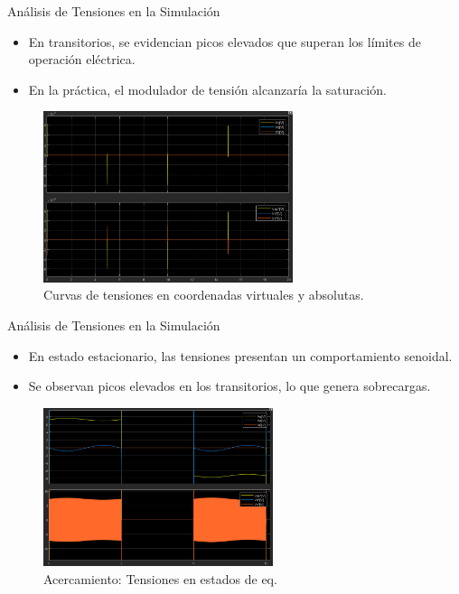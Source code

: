 \documentclass[12pt]{beamer}
\begin{document}
\begin{frame}{Análisis de Tensiones en la Simulación}
    \begin{itemize}
        \item En transitorios, se evidencian picos elevados que superan los límites de operación eléctrica.
        \item En la práctica, el modulador de tensión alcanzaría la saturación.
    \end{itemize}
    \begin{figure}[H]
        \centering
        \includegraphics[width=0.65\textwidth]{Imagenes/TensionesSimulacionCompleta.png}
        \caption{Curvas de tensiones en coordenadas virtuales y absolutas.}
    \end{figure}
\end{frame}

\begin{frame}{Análisis de Tensiones en la Simulación}
    \begin{itemize}
        \item En estado estacionario, las tensiones presentan un comportamiento senoidal.
        \item Se observan picos elevados en los transitorios, lo que genera sobrecargas.
    \end{itemize}
    \begin{figure}[H]
        \centering
        \includegraphics[width=0.6\textwidth]{Imagenes/AcercamientoTensionesEstacionariasSimulacion.png}
        \caption{Acercamiento: Tensiones en estados de eq.}
    \end{figure}
\end{frame}
\end{document}
